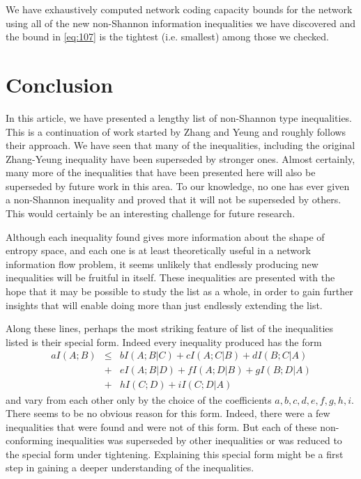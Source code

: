 \documentclass[10pt,journal]{IEEEtran}
\begin{document}
We have exhaustively computed network coding capacity bounds
for the \Vamos{} network using all of the new non-Shannon information
inequalities we have discovered and
the bound in \eqref{eq:107} is the tightest (i.e. smallest)
among those we checked.






\section{Conclusion}

In this article, we have presented a lengthy list of non-Shannon type inequalities.
This is a continuation of work started by Zhang and Yeung and roughly follows their approach.
We have seen that many of the inequalities, including the original Zhang-Yeung inequality have
been superseded by stronger ones.  Almost certainly, many more of the inequalities that have been presented
here will also be superseded by future work in this area.  To our knowledge, no one has ever given a non-Shannon
inequality and proved that it will not be superseded by others.  This would certainly be an interesting challenge for
future research.

Although each inequality found gives more information about the shape of entropy space, and each one is at least theoretically
useful in a network information flow problem, it seems unlikely that endlessly producing new inequalities will be fruitful in itself.
These inequalities are presented with the hope that it may be possible to study the list as a whole, in order to gain further insights
that will enable doing more than just endlessly extending the list.

Along these lines, perhaps the most striking feature of list of the inequalities listed is their special form.
Indeed every inequality produced has the form
\begin{eqnarray*}
aI(A;B) &\leq& bI(A;B|C) + cI(A;C|B) + dI(B;C|A) \\
      &+&  eI(A;B|D) + fI(A;D|B)+ gI(B;D|A)\\
      &+& hI(C;D) + iI(C;D|A)
\end{eqnarray*}
and vary from each other only by the choice of the coefficients $a,b,c,d,e,f,g,h,i$. There seems to be no obvious reason for this form.
Indeed, there were a few inequalities that were found and were not of this form.  But each of these non-conforming inequalities was
superseded by other inequalities or was reduced to the special form under tightening.
Explaining this special form might be a first step in gaining a deeper understanding of the inequalities.
\end{document}
